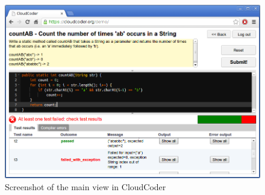 \documentclass{sig-alternate}
\begin{document}

% 
%



\begin{figure}
\centering
\includegraphics[width=5.5in]{images/screenshot4}
\caption{Screenshot of the main view in CloudCoder}
\label{screenshot}
\end{figure}
\end{document}
